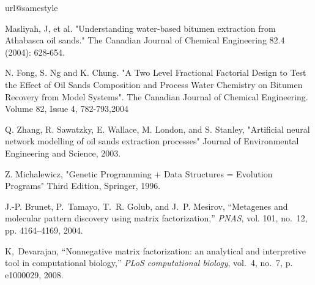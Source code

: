\documentclass[10pt,journal,compsoc]{IEEEtran}
\begin{document}
\ifCLASSOPTIONcaptionsoff
  \newpage
\fi

\begin{thebibliography}{10}
	\providecommand{\url}[1]{#1}
	\csname url@samestyle\endcsname
	\providecommand{\newblock}{\relax}
	\providecommand{\bibinfo}[2]{#2}
	\providecommand{\BIBentrySTDinterwordspacing}{\spaceskip=0pt\relax}
	\providecommand{\BIBentryALTinterwordstretchfactor}{4}
	\providecommand{\BIBentryALTinterwordspacing}{\spaceskip=\fontdimen2\font plus
		\BIBentryALTinterwordstretchfactor\fontdimen3\font minus
		\fontdimen4\font\relax}
	\providecommand{\BIBforeignlanguage}[2]{{%
			\expandafter\ifx\csname l@#1\endcsname\relax
			\typeout{** WARNING: IEEEtran.bst: No hyphenation pattern has been}%
			\typeout{** loaded for the language `#1'. Using the pattern for}%
			\typeout{** the default language instead.}%
			\else
			\language=\csname l@#1\endcsname
			\fi
			#2}}
	\providecommand{\BIBdecl}{\relax}
	\BIBdecl
	
	
	Masliyah, J, et al. "Understanding water‐based bitumen extraction from Athabasca oil sands." The Canadian Journal of Chemical Engineering 82.4 (2004): 628-654.
	
	N. Fong, S. Ng and K. Chung. "A Two Level Fractional Factorial Design to Test the Effect of Oil Sands Composition and Process Water Chemistry on Bitumen Recovery from Model Systems". The Canadian Journal of Chemical Engineering. Volume 82, Issue 4, 782-793,2004
	
	Q. Zhang, R. Sawatzky, E. Wallace, M. London, and S. Stanley,
	"Artificial neural network modelling of oil sands extraction processes"
	Journal of Environmental Engineering and Science, 2003.
		

			
	Z. Michalewicz,
	"Genetic Programming + Data Structures = Evolution Programs"
	Third Edition, Springer, 1996.
	
	J.-P. Brunet, P.~Tamayo, T.~R. Golub, and J.~P. Mesirov, ``Metagenes and
	molecular pattern discovery using matrix factorization,'' \emph{PNAS}, vol.
	101, no.~12, pp. 4164--4169, 2004.
	
	K,~Devarajan, ``Nonnegative matrix factorization: an analytical and
	interpretive tool in computational biology,'' \emph{PLoS computational
	biology}, vol.~4, no.~7, p. e1000029, 2008.
	

\end{thebibliography}
\end{document}
